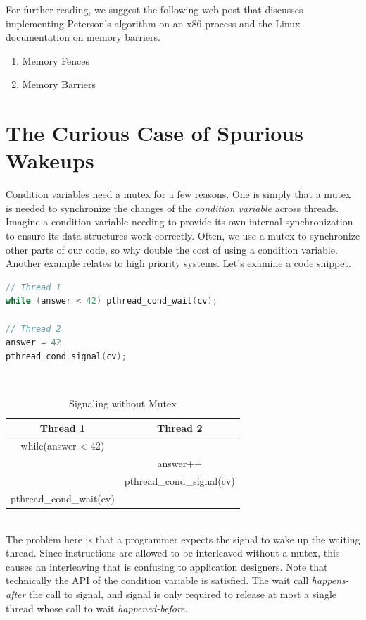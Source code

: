 For further reading, we suggest the following web post that discusses implementing Peterson's algorithm on an x86 process and the Linux documentation on memory barriers.
\begin{enumerate}
\item \href{http://bartoszmilewski.com/2008/11/05/who-ordered-memory-fences-on-an-x86/}{Memory Fences}
\item \href{http://lxr.free-electrons.com/source/Documentation/memory-barriers.txt}{Memory Barriers}
\end{enumerate}


\section{The Curious Case of Spurious Wakeups}

Condition variables need a mutex for a few reasons.
One is simply that a mutex is needed to synchronize the changes of the \textit{condition variable} across threads.
Imagine a condition variable needing to provide its own internal synchronization to ensure its data structures work correctly.
Often, we use a mutex to synchronize other parts of our code, so why double the cost of using a condition variable.
Another example relates to high priority systems.
Let's examine a code snippet.

\begin{lstlisting}[language=C]
// Thread 1
while (answer < 42) pthread_cond_wait(cv);

// Thread 2
answer = 42
pthread_cond_signal(cv);
\end{lstlisting}

\\
\begin{center}
\begin{table}[h]
\caption{Signaling without Mutex}
\begin{tabular}{|c|c|}
  Thread 1 & Thread 2 \\ \hline
  while(answer < 42) & \\
  & answer++ \\
  & pthread\_cond\_signal(cv) \\
  pthread\_cond\_wait(cv)
\end{tabular}
\end{table}
\end{center}
\\
The problem here is that a programmer expects the signal to wake up the waiting thread.
Since instructions are allowed to be interleaved without a mutex, this causes an interleaving that is confusing to application designers.
Note that technically the API of the condition variable is satisfied.
The wait call \textit{happens-after} the call to signal, and signal is only required to release at most a single thread whose call to wait \textit{happened-before}.

